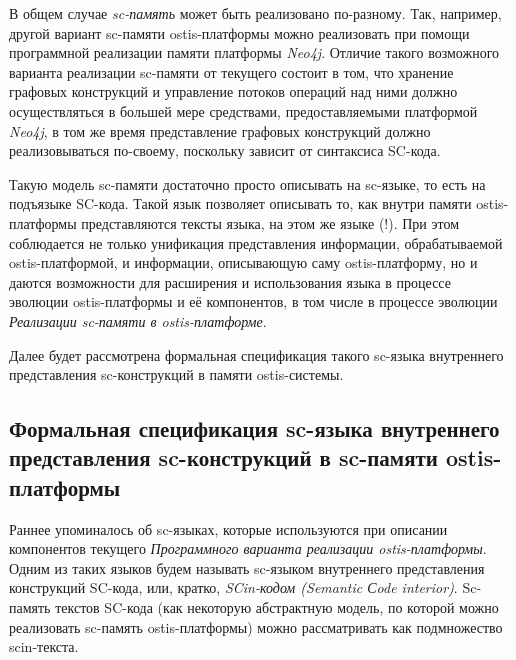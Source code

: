 В общем случае \textit{sc-память} может быть реализовано по-разному. Так, например, другой вариант sc-памяти ostis-платформы можно реализовать при помощи программной реализации памяти платформы \textit{Neo4j}. Отличие такого возможного варианта реализации sc-памяти от текущего состоит в том, что хранение графовых конструкций и управление потоков операций над ними должно осуществляться в большей мере средствами, предоставляемыми платформой \textit{Neo4j}, в том же время представление графовых конструкций должно реализовываться по-своему, поскольку зависит от синтаксиса SC-кода.

Такую модель sc-памяти достаточно просто описывать на sc-языке, то есть на подъязыке SC-кода. Такой язык позволяет описывать то, как внутри памяти ostis-платформы представляются тексты языка, на этом же языке (!). При этом соблюдается не только унификация представления информации, обрабатываемой ostis-платформой, и информации, описывающую саму ostis-платформу, но и даются возможности для расширения и использования языка в процессе эволюции ostis-платформы и её компонентов, в том числе в процессе эволюции \textit{Реализации sc-памяти в ostis-платформе}.

Далее будет рассмотрена формальная спецификация такого sc-языка внутреннего представления sc-конструкций в памяти ostis-системы.

\subsection{Формальная спецификация sc-языка внутреннего представления sc-конструкций в sc-памяти ostis-платформы}
\label{sec_soft_platform_scin_code}

Раннее упоминалось об sc-языках, которые используются при описании компонентов текущего \textit{Программного варианта реализации ostis-платформы}. Одним из таких языков будем называть sc-языком внутреннего представления конструкций SC-кода, или, кратко, \textit{SCin-кодом (Semantic Сode interior)}. Sc-память текстов SC-кода (как некоторую абстрактную модель, по которой можно реализовать sc-память ostis-платформы) можно рассматривать как подмножество scin-текста.

\begin{SCn}
\begin{scnindent}
\end{scnindent}
\end{SCn}

